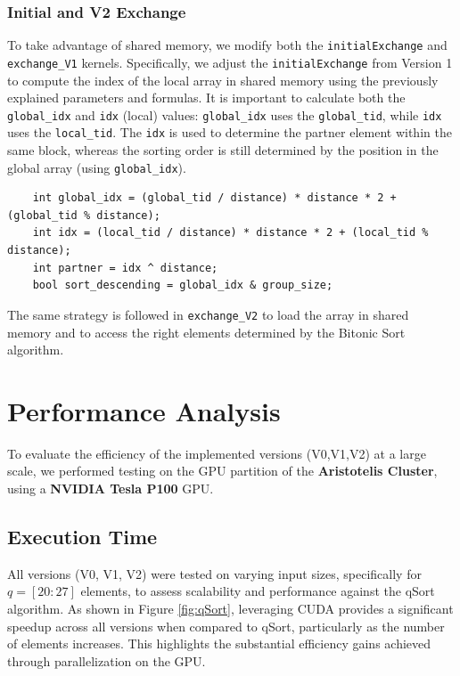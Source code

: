 \documentclass[a4paper,12pt]{article}
\begin{document}
\subsubsection*{Initial and V2 Exchange}
To take advantage of shared memory, we modify both the \texttt{initialExchange} and \texttt{exchange\_V1} kernels. Specifically, we adjust the \texttt{initialExchange} from Version 1 to compute the index of the local array in shared memory using the previously explained parameters and formulas. It is important to calculate both the \texttt{global\_idx} and \texttt{idx} (local) values: \texttt{global\_idx} uses the \texttt{global\_tid}, while \texttt{idx} uses the \texttt{local\_tid}. The \texttt{idx} is used to determine the partner element within the same block, whereas the sorting order is still determined by the position in the global array (using \texttt{global\_idx}).
\\
\begin{lstlisting}
    int global_idx = (global_tid / distance) * distance * 2 + (global_tid % distance);
    int idx = (local_tid / distance) * distance * 2 + (local_tid % distance);
    int partner = idx ^ distance;
    bool sort_descending = global_idx & group_size;
\end{lstlisting}
The same strategy is followed in \texttt{exchange\_V2} to load the array in shared memory and to access the right elements determined by the Bitonic Sort algorithm.

\section{Performance Analysis}
To evaluate the efficiency of the implemented versions (V0,V1,V2) at a large scale, we performed testing on the GPU partition of the \textbf{Aristotelis Cluster}, using a \textbf{NVIDIA Tesla P100} GPU.

\subsection{Execution Time}
All versions (V0, V1, V2) were tested on varying input sizes, specifically for \( q = [20:27] \) elements, to assess scalability and performance against the qSort algorithm. As shown in Figure \ref{fig:qSort}, leveraging CUDA provides a significant speedup across all versions when compared to qSort, particularly as the number of elements increases. This highlights the substantial efficiency gains achieved through parallelization on the GPU.
\end{document}
